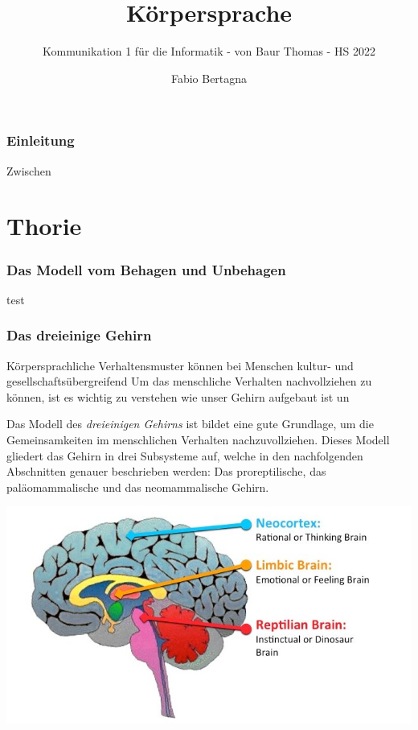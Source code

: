 \documentclass[
    invert-title=false,
    titlepage=true,
    titleimage-ratio=1011,
    parskip=half-,
]{bfhpub}                %
\title{Körpersprache}
\subtitle{Kommunikation 1 für die Informatik - von Baur Thomas - HS 2022}
\author{Fabio Bertagna}
\institute{Kommunikation 1 für die Informatik}
\begin{document}
    \maketitle
    \tableofcontents


    \section{Einleitung}\label{sec:vorwort}
    Zwischen

    \part{Thorie}
    \section{Das Modell vom Behagen und Unbehagen}\label{sec:das-modell-vom-behagen-und-unbehagen}
    test\cite{menschen_verstehen_und_lenken,menschen_lesen}

    \section{Das dreieinige Gehirn}\label{sec:das-dreieinige-gehirn}
    Körpersprachliche Verhaltensmuster können bei Menschen kultur- und gesellschaftsübergreifend
    Um das menschliche Verhalten nachvollziehen zu können, ist es wichtig zu verstehen wie unser Gehirn aufgebaut ist un

    Das Modell des \textit{dreieinigen Gehirns} ist bildet eine gute Grundlage, um die Gemeinsamkeiten im menschlichen Verhalten nachzuvollziehen.
    Dieses Modell gliedert das Gehirn in drei Subsysteme auf, welche in den nachfolgenden Abschnitten genauer beschrieben werden:
    Das proreptilische, das paläomammalische und das neomammalische Gehirn.

    \includegraphics[width=\textwidth]{images/brain}
\end{document}
